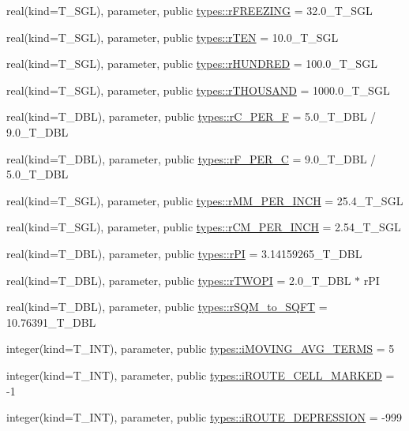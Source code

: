 \begin{DoxyCompactItemize}
\item 
real(kind=T\_\-SGL), parameter, public \hyperlink{namespacetypes_a80a8178ea4741071027cb936192002ad}{types::rFREEZING} = 32.0\_\-T\_\-SGL
\item 
real(kind=T\_\-SGL), parameter, public \hyperlink{namespacetypes_ad2b16166ee54c6521c92846ca1867905}{types::rTEN} = 10.0\_\-T\_\-SGL
\item 
real(kind=T\_\-SGL), parameter, public \hyperlink{namespacetypes_a97b2b1d206618d3a266b45e582f7ebf3}{types::rHUNDRED} = 100.0\_\-T\_\-SGL
\item 
real(kind=T\_\-SGL), parameter, public \hyperlink{namespacetypes_a46c52dedd7fb25f5de9fdbd1ce795aaa}{types::rTHOUSAND} = 1000.0\_\-T\_\-SGL
\item 
real(kind=T\_\-DBL), parameter, public \hyperlink{namespacetypes_a5ff46874e183669d28f6a46080ea20b7}{types::rC\_\-PER\_\-F} = 5.0\_\-T\_\-DBL / 9.0\_\-T\_\-DBL
\item 
real(kind=T\_\-DBL), parameter, public \hyperlink{namespacetypes_a663b1a3284266c4c5cdbcfb63753f352}{types::rF\_\-PER\_\-C} = 9.0\_\-T\_\-DBL / 5.0\_\-T\_\-DBL
\item 
real(kind=T\_\-SGL), parameter, public \hyperlink{namespacetypes_ae91353f2b870e14fa790e351b8b3f865}{types::rMM\_\-PER\_\-INCH} = 25.4\_\-T\_\-SGL
\item 
real(kind=T\_\-SGL), parameter, public \hyperlink{namespacetypes_ab949fb6f49c2e3dfb6fa084310d81edf}{types::rCM\_\-PER\_\-INCH} = 2.54\_\-T\_\-SGL
\item 
real(kind=T\_\-DBL), parameter, public \hyperlink{namespacetypes_a1f9e52478e9651360f7bd82fa744caa3}{types::rPI} = 3.14159265\_\-T\_\-DBL
\item 
real(kind=T\_\-DBL), parameter, public \hyperlink{namespacetypes_ae0e7691ed560223af53b3ff28efafc11}{types::rTWOPI} = 2.0\_\-T\_\-DBL $\ast$ rPI
\item 
real(kind=T\_\-DBL), parameter, public \hyperlink{namespacetypes_a2f2f871f373ad3176f43993fc23103a5}{types::rSQM\_\-to\_\-SQFT} = 10.76391\_\-T\_\-DBL
\item 
integer(kind=T\_\-INT), parameter, public \hyperlink{namespacetypes_abe11dbc06cabd68c258ab0fff0c89d26}{types::iMOVING\_\-AVG\_\-TERMS} = 5
\item 
integer(kind=T\_\-INT), parameter, public \hyperlink{namespacetypes_a42e13c9e6b0154abfab9212d6d7e6484}{types::iROUTE\_\-CELL\_\-MARKED} = -\/1
\item 
integer(kind=T\_\-INT), parameter, public \hyperlink{namespacetypes_af9ac3dcedd1cd95154ef3208d656a7cc}{types::iROUTE\_\-DEPRESSION} = -\/999

\end{DoxyCompactItemize}

